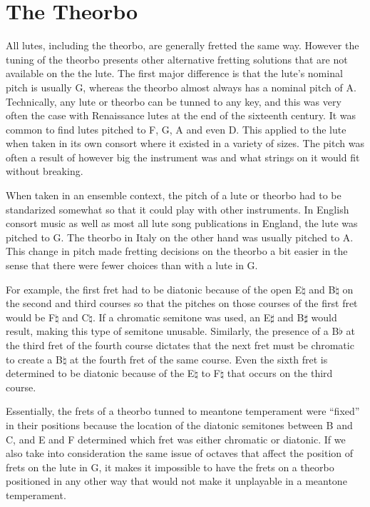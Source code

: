 \section{The Theorbo}

All lutes, including the theorbo, are generally fretted the same way.  However the tuning
of the theorbo presents other alternative fretting solutions that are not available on the
the lute. The first major difference is that the lute's nominal pitch is usually G,
whereas the theorbo almost always has a nominal pitch of A.  Technically, any lute or
theorbo can be tunned to any key, and this was very often the case with Renaissance lutes
at the end of the sixteenth century. It was common to find lutes pitched to F, G, A and
even D.  This applied to the lute when taken in its own consort where it existed in a
variety of sizes.  The pitch was often a result of however big the instrument was and what
strings on it would fit without breaking.

When taken in an ensemble context, the pitch of a lute or theorbo had to be standarized
somewhat so that it could play with other instruments.  In English consort music as well
as most all lute song publications in England, the lute was pitched to G.  The theorbo in
Italy on the other hand was usually pitched to A.  This change in pitch made fretting
decisions on the theorbo a bit easier in the sense that there were fewer choices than with
a lute in G.

For example, the first fret had to be diatonic because of the open E$\natural$ and
B$\natural$ on the second and third courses so that the pitches on those courses of the
first fret would be F$\natural$ and C$\natural$.  If a chromatic semitone was used, an
E$\sharp$ and B$\sharp$ would result, making this type of semitone unusable. Similarly,
the presence of a B$\flat$ at the third fret of the fourth course dictates that the next
fret must be chromatic to create a B$\natural$ at the fourth fret of the same course.
Even the sixth fret is determined to be diatonic because of the E$\natural$ to F$\natural$
that occurs on the third course.

Essentially, the frets of a theorbo tunned to meantone temperament were ``fixed'' in their
positions because the location of the diatonic semitones between B and C, and E and F
determined which fret was either chromatic or diatonic.  If we also take into
consideration the same issue of octaves that affect the position of frets on the lute in
G, it makes it impossible to have the frets on a theorbo positioned in any other way that
would not make it unplayable in a meantone temperament.

